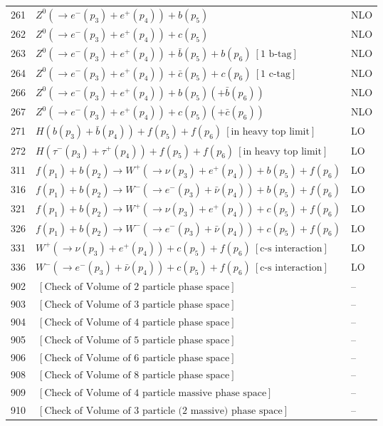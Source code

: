 \documentclass[12pt]{article}
\begin{document}
\begin{itemize}
\begin{table}
\begin{center}
\begin{tabular}{|l|l|l|}
261& $ Z^0(\to e^-(p_3)+e^+(p_4))+b(p_5) $ & NLO \\
262& $ Z^0(\to e^-(p_3)+e^+(p_4))+c(p_5) $ & NLO \\
263& $ Z^0(\to e^-(p_3)+e^+(p_4))+\bar{b}(p_5)+b(p_6) ~[ \mbox{1 b-tag} ] $ & NLO \\
264& $ Z^0(\to e^-(p_3)+e^+(p_4))+\bar{c}(p_5)+c(p_6) ~[ \mbox{1 c-tag} ] $ & NLO \\
266& $ Z^0(\to e^-(p_3)+e^+(p_4))+b(p_5)(+\bar{b}(p_6)) $ & NLO \\
267& $ Z^0(\to e^-(p_3)+e^+(p_4))+c(p_5)(+\bar{c}(p_6)) $ & NLO \\
\hline 
271& $ H(b(p_3)+\bar{b}(p_4))+f(p_5)+f(p_6)~[ \mbox{in heavy top limit} ] $ & LO \\
272& $ H(\tau^-(p_3)+\tau^+(p_4))+f(p_5)+f(p_6)~[ \mbox{in heavy top limit} ] $ & LO \\
\hline 
311& $  f(p_1)+b(p_2) \to  W^+(\to \nu(p_3)+e^+(p_4))+b(p_5)+f(p_6) $ & LO \\
316& $  f(p_1)+b(p_2) \to  W^-(\to e^-(p_3)+\bar{\nu}(p_4))+b(p_5)+f(p_6) $ & LO \\
\hline 
321& $  f(p_1)+b(p_2) \to  W^+(\to \nu(p_3)+e^+(p_4))+c(p_5)+f(p_6) $ & LO \\
326& $  f(p_1)+b(p_2) \to  W^-(\to e^-(p_3)+\bar{\nu}(p_4))+c(p_5)+f(p_6) $ & LO \\
\hline 
331& $ W^+(\to \nu(p_3)+e^+(p_4))+c(p_5)+f(p_6) ~[ \mbox{c-s interaction} ] $ & LO \\
336& $ W^-(\to e^-(p_3)+\bar{\nu}(p_4))+c(p_5)+f(p_6) ~[ \mbox{c-s interaction} ] $ & LO \\
\hline 
902& $  ~[ \mbox{Check of Volume of 2 particle phase space} ] $ & -- \\
903& $  ~[ \mbox{Check of Volume of 3 particle phase space} ] $ & -- \\
904& $  ~[ \mbox{Check of Volume of 4 particle phase space} ] $ & -- \\
905& $  ~[ \mbox{Check of Volume of 5 particle phase space} ] $ & -- \\
906& $  ~[ \mbox{Check of Volume of 6 particle phase space} ] $ & -- \\
908& $  ~[ \mbox{Check of Volume of 8 particle phase space} ] $ & -- \\
909& $  ~[ \mbox{Check of Volume of 4 particle massive phase space} ] $ & -- \\
910& $  ~[ \mbox{Check of Volume of 3 particle (2 massive) phase space} ] $ & -- \\



\end{tabular}
\end{center}
\end{table}
\end{itemize}
\end{document}

